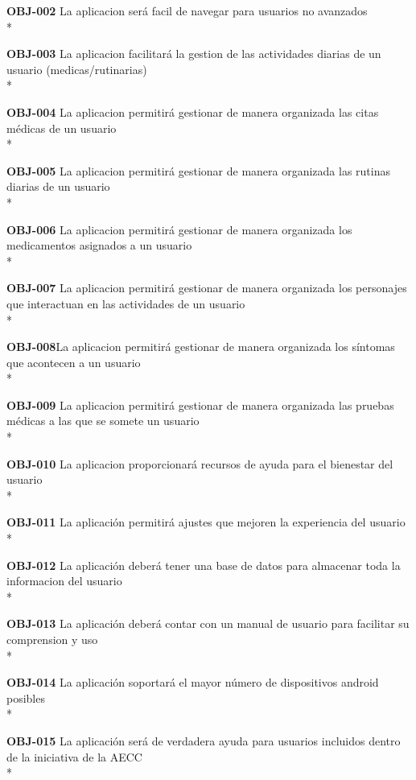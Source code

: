 \documentclass[../pfc.tex]{subfiles}
\begin{document}
	\textbf{OBJ-002}	La aplicacion será facil de navegar para usuarios no avanzados\\*
	
	\textbf{OBJ-003}	La aplicacion facilitará la gestion de las actividades diarias de un usuario (medicas/rutinarias)\\*
	
	\textbf{OBJ-004}	La aplicacion permitirá gestionar de manera organizada las citas médicas de un usuario\\*
	
	\textbf{OBJ-005}	La aplicacion permitirá gestionar de manera organizada las rutinas diarias de un usuario\\*
	
	\textbf{OBJ-006}	La aplicacion permitirá gestionar de manera organizada los medicamentos asignados a un usuario\\*
	
	\textbf{OBJ-007}	La aplicacion permitirá gestionar de manera organizada los personajes que interactuan en las
	 actividades de un usuario\\*
	
	\textbf{OBJ-008}La aplicacion permitirá gestionar de manera organizada los síntomas que acontecen a un usuario\\*
	
	\textbf{OBJ-009}	La aplicacion permitirá gestionar de manera organizada las pruebas médicas a las que se somete un
	 usuario\\*
	
	\textbf{OBJ-010}	La aplicacion proporcionará recursos de ayuda para el bienestar del usuario\\*
	
	\textbf{OBJ-011}	La aplicación permitirá ajustes que mejoren la experiencia del usuario\\*
	
	\textbf{OBJ-012}	La aplicación deberá tener una base de datos para almacenar toda la informacion del usuario\\*
	
	\textbf{OBJ-013}	La aplicación deberá contar con un manual de usuario para facilitar su comprension y uso\\*
	
	\textbf{OBJ-014}	La aplicación soportará el mayor número de dispositivos android posibles\\*
	
	\textbf{OBJ-015}	La aplicación será de verdadera ayuda para usuarios incluidos dentro de la iniciativa de la AECC\\*
	
\end{document}
